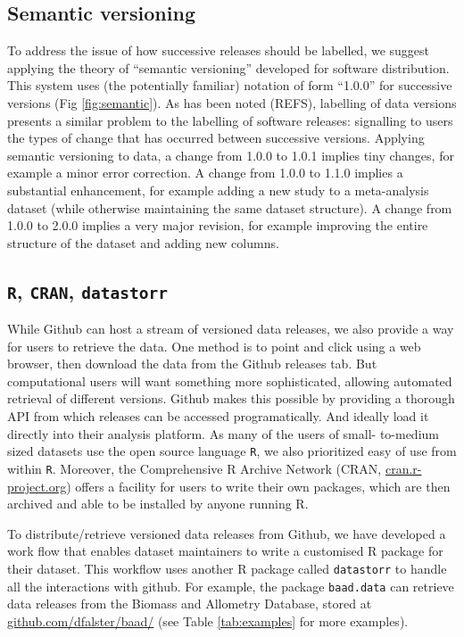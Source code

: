 \documentclass[a4paper,11pt]{article}
\newcommand{\smurl}[1]{{\footnotesize\url{#1}}}
\newcommand{\ghsmurl}[1]{{\footnotesize\href{}{#1}}}
\begin{document}
\subsection{Semantic versioning}

To address the issue of how successive releases should be labelled, we suggest
applying the theory of ``semantic versioning'' developed for software
distribution. This system uses (the potentially familiar) notation of form
``1.0.0'' for successive versions (Fig \ref{fig:semantic}). As has been noted
(REFS), labelling of data versions presents a similar problem to the labelling
of software releases: signalling to users the types of change that has
occurred between successive versions. Applying semantic versioning to data, a
change from 1.0.0 to 1.0.1 implies tiny changes, for example a minor error
correction. A change from 1.0.0 to 1.1.0 implies a substantial enhancement,
for example adding a new study to a meta-analysis dataset (while otherwise
maintaining the same dataset structure). A change from 1.0.0 to 2.0.0 implies
a very major revision, for example improving the entire structure of the
dataset and adding new columns.

\subsection{\texttt{R}, \texttt{CRAN}, \texttt{datastorr}}

While Github can host a stream of versioned data releases, we also provide a
way for users to retrieve the data. One method is to point and click using a
web browser, then download the data from the Github releases tab. But
computational users will want something more sophisticated, allowing automated
retrieval of different versions. Github makes this possible by providing a
thorough API from which releases can be accessed programatically. And ideally
load it directly into their analysis platform. As many of the users of small-
to-medium sized datasets use the open source language \texttt{R}, we also
prioritized easy of use from within \texttt{R}. Moreover, the  Comprehensive R
Archive Network (CRAN, \smurl{cran.r-project.org}) offers a facility for users
to write their own packages, which are then archived and able to be installed
by anyone running R.

To distribute/retrieve versioned data releases from Github, we have developed
a  work flow that enables dataset maintainers to write a customised R package
for their dataset. This workflow uses another R package called
\texttt{datastorr} to handle all the interactions with github. For example, the package
\texttt{baad.data} can retrieve data releases from the Biomass and Allometry Database, stored at \ghsmurl{github.com/dfalster/baad/} (see Table \ref{tab:examples} for more examples).
\end{document}
